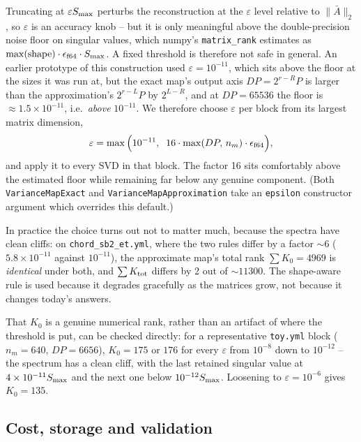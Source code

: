 \documentclass{article}
\numberwithin{equation}{section}   %
\begin{document}
Truncating at $\varepsilon S_{\rm max}$ perturbs the reconstruction at the $\varepsilon$ level
relative to $\|\bar A\|_2$, so $\varepsilon$ is an accuracy knob -- but it is only meaningful
above the double-precision noise floor on singular values, which numpy's {\tt matrix\_rank}
estimates as $\max(\mbox{shape}) \cdot \epsilon_{\rm f64} \cdot S_{\rm max}$.
A fixed threshold is therefore not safe in general. An earlier prototype of this construction
used $\varepsilon = 10^{-11}$, which sits above the floor at the sizes it was run at, but the exact
map's output axis $DP = 2^{r-R}P$ is larger than the approximation's $2^{r-L}P$ by $2^{L-R}$,
and at $DP = 65536$ the floor is $\approx 1.5 \times 10^{-11}$, i.e.\ {\em above} $10^{-11}$. We
therefore choose $\varepsilon$ per block from its largest matrix dimension,
\begin{equation}
\varepsilon = \max\Big( 10^{-11}, \;\; 16 \cdot \max(DP,\, n_m) \cdot \epsilon_{\rm f64} \Big),
\label{eq:svdx_epsilon}
\end{equation}
and apply it to every SVD in that block. The factor 16 sits comfortably above the estimated
floor while remaining far below any genuine component. (Both {\tt VarianceMapExact} and
{\tt VarianceMapApproximation} take an {\tt epsilon} constructor argument which overrides this
default.)

In practice the choice turns out not to matter much, because the spectra have clean cliffs:
on {\tt chord\_sb2\_et.yml}, where the two rules differ by a factor $\sim\!6$
($5.8\times10^{-11}$ against $10^{-11}$), the approximate map's total rank
$\sum K_0 = 4969$ is {\em identical} under both, and $\sum K_{\rm tot}$ differs by 2 out of
$\sim\!11300$. The shape-aware rule is used because it degrades gracefully as the matrices grow,
not because it changes today's answers.

That $K_0$ is a genuine numerical rank, rather than an artifact of where the threshold is put,
can be checked directly: for a representative {\tt toy.yml} block ($n_m = 640$,
$DP = 6656$), $K_0 = 175$ or $176$ for every $\varepsilon$ from $10^{-8}$ down to $10^{-12}$ --
the spectrum has a clean cliff, with the last retained singular value at
$4 \times 10^{-11} S_{\rm max}$ and the next one below $10^{-12} S_{\rm max}$. Loosening to
$\varepsilon = 10^{-6}$ gives $K_0 = 135$.

\subsection{Cost, storage and validation}
\label{ssec:svd_exact_cost}
\end{document}
